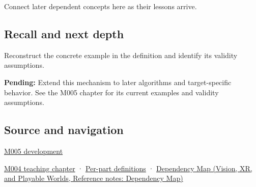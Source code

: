 Connect later dependent concepts here as their lessons arrive.

\subsection{Recall and next depth}\label{appendix-ed8531b46754-recall-and-next-depth}

Reconstruct the concrete example in the definition and identify its validity assumptions.

\textbf{Pending:} Extend this mechanism to later algorithms and target-specific behavior. See the M005 chapter for its current examples and validity assumptions.

\subsection{Source and navigation}\label{appendix-ed8531b46754-source-and-navigation}

\hyperref[01-foundations-i-ch001-when-arithmetic-meets-uncertainty]{M005 development}

\hyperref[01-foundations-i-ch001-a-stretching-ruler-for-real-valued-quantities]{M004 teaching chapter} · \hyperref[appendix-fd090d982a15-m004---parts-61-76]{Per-part definitions} · \href{../07-Vision-XR-and-Playable-Worlds/main.pdf\#nameddest=appendix-4ad47bdd269a}{Dependency Map (Vision, XR, and Playable Worlds, Reference notes: Dependency Map)}
